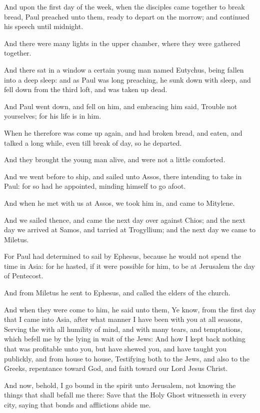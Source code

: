 \Verse And upon the first day of the week, when the disciples came together to break bread, Paul preached unto them, ready to depart on the morrow; and continued his speech until midnight.

\Verse And there were many lights in the upper chamber, where they were gathered together.

\Verse And there sat in a window a certain young man named Eutychus, being fallen into a deep sleep: and as Paul was long preaching, he sunk down with sleep, and fell down from the third loft, and was taken up dead.

\Verse And Paul went down, and fell on him, and embracing him said, Trouble not yourselves; for his life is in him.

\Verse When he therefore was come up again, and had broken bread, and eaten, and talked a long while, even till break of day, so he departed.

\Verse And they brought the young man alive, and were not a little comforted.

\Verse And we went before to ship, and sailed unto Assos, there intending to take in Paul: for so had he appointed, minding himself to go afoot.

\Verse And when he met with us at Assos, we took him in, and came to Mitylene.

\Verse And we sailed thence, and came the next day over against Chios; and the next day we arrived at Samos, and tarried at Trogyllium; and the next day we came to Miletus.

\Verse For Paul had determined to sail by Ephesus, because he would not spend the time in Asia: for he hasted, if it were possible for him, to be at Jerusalem the day of Pentecost.

\Verse And from Miletus he sent to Ephesus, and called the elders of the church.

\Verse And when they were come to him, he said unto them, Ye know, from the first day that I came into Asia, after what manner I have been with you at all seasons, \Verse Serving the \LORD with all humility of mind, and with many tears, and temptations, which befell me by the lying in wait of the Jews: \Verse And how I kept back nothing that was profitable unto you, but have shewed you, and have taught you publickly, and from house to house, \Verse Testifying both to the Jews, and also to the Greeks, repentance toward God, and faith toward our Lord Jesus Christ.

\Verse And now, behold, I go bound in the spirit unto Jerusalem, not knowing the things that shall befall me there: \Verse Save that the Holy Ghost witnesseth in every city, saying that bonds and afflictions abide me.

